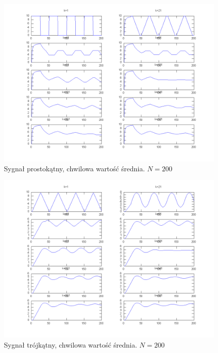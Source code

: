 \documentclass[wide,a4paper,titlepage,12pt]{mwart}
\begin{document}
      \begin{landscape}
        \begin{figure}[htbp]
          \begin{center}
            \includegraphics[scale=.5]{out/Figure3.png}
            \caption{\label{wykres3}Sygnał prostokątny, chwilowa wartość średnia. $N=200$}
          \end{center}
        \end{figure}
      \end{landscape}

      \begin{landscape}
        \begin{figure}[htbp]
          \begin{center}
            \includegraphics[scale=.5]{out/Figure4.png}
            \caption{\label{wykres4}Sygnał trójkątny, chwilowa wartość średnia. $N=200$}
          \end{center}
        \end{figure}
      \end{landscape}
\end{document}
